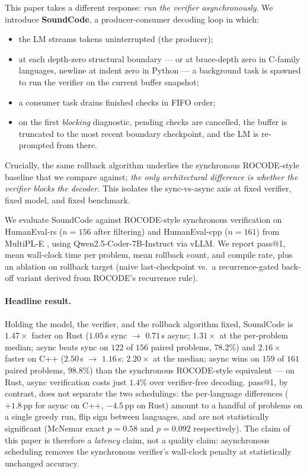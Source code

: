 This paper takes a different response: \emph{run the verifier
asynchronously}. We introduce \textbf{SoundCode}, a producer-consumer
decoding loop in which:
\begin{itemize}[itemsep=2pt,topsep=2pt]
\item the LM streams tokens uninterrupted (the producer);
\item at each depth-zero structural boundary --- \code{;} or \code{\}}
  at brace-depth zero in C-family languages, newline at indent zero in
  Python --- a background task is spawned to run the verifier on the
  current buffer snapshot;
\item a consumer task drains finished checks in FIFO order;
\item on the first \emph{blocking} diagnostic, pending checks are
  cancelled, the buffer is truncated to the most recent
  boundary checkpoint, and the LM is re-prompted from there.
\end{itemize}
Crucially, the same rollback algorithm underlies the synchronous
ROCODE-style baseline that we compare against; \emph{the only
architectural difference is whether the verifier blocks the
decoder.} This isolates the sync-vs-async axis at fixed verifier,
fixed model, and fixed benchmark.

We evaluate SoundCode against ROCODE-style synchronous verification
on HumanEval-rs ($n\!=\!156$ after filtering) and HumanEval-cpp
($n\!=\!161$) from MultiPL-E \citep{cassano2022multipl}, using
Qwen2.5-Coder-7B-Instruct \citep{hui2024qwen25coder} via vLLM. We
report pass@1, mean wall-clock time per problem, mean rollback
count, and compile rate, plus an ablation on rollback target
(naive last-checkpoint vs.\ a recurrence-gated back-off variant
derived from ROCODE's recurrence rule).

\paragraph{Headline result.}
Holding the model, the verifier, and the rollback algorithm fixed,
SoundCode is $1.47\times$ faster on Rust ($1.05$\,s sync $\to$
$0.71$\,s async; $1.31\times$ at the per-problem median; async beats
sync on $122$ of $156$ paired problems, $78.2\%$) and $2.16\times$
faster on C++ ($2.50$\,s $\to$ $1.16$\,s; $2.20\times$ at the median;
async wins on $159$ of $161$ paired problems, $98.8\%$) than the
synchronous ROCODE-style equivalent --- on Rust, async
verification costs just $1.4\%$ over verifier-free decoding.
pass@1, by contrast, does not
separate the two schedulings: the per-language differences
($+1.8$\,pp for async on C++, $-4.5$\,pp on Rust) amount to a
handful of problems on a single greedy run, flip sign between
languages, and are not statistically significant (McNemar exact
$p\!=\!0.58$ and $p\!=\!0.092$ respectively). The claim of this paper
is therefore a \emph{latency} claim, not a quality claim:
asynchronous scheduling removes the synchronous verifier's
wall-clock penalty at statistically unchanged accuracy.

